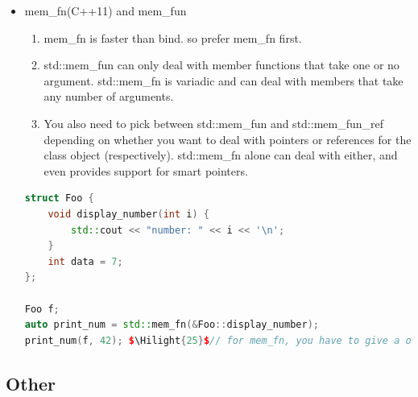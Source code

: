 \documentclass[a4paper,12pt,twoside]{book}
\newcommand{\Hilight}[1]{\makebox[0pt][l]{\color{yellow}\rule[-3pt]{#1em}{11pt}}}
\begin{document}
\begin{itemize}
\item mem\_fn(C++11) and mem\_fun
\begin{enumerate}
\item mem\_fn is faster than bind.  so prefer mem\_fn first.
\item std::mem\_fun can only deal with member functions that take one or no argument. std::mem\_fn is variadic and can deal with members that take any number of arguments.
\item You also need to pick between std::mem\_fun and std::mem\_fun\_ref depending on whether you want to deal with pointers or references for the class object (respectively). std::mem\_fn alone can deal with either, and even provides support for smart pointers.
\end{enumerate}

\begin{lstlisting}[frame=single, language=c++, mathescape=true]
struct Foo {
    void display_number(int i) {
        std::cout << "number: " << i << '\n';
    }
    int data = 7;
};

Foo f;
auto print_num = std::mem_fn(&Foo::display_number);
print_num(f, 42); $\Hilight{25}$// for mem_fn, you have to give a object:f
\end{lstlisting}

\end{itemize}

\subsection{Other}
\end{document}
